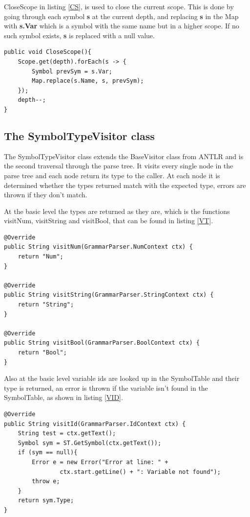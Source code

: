 CloseScope in listing \ref{CS}, is used to close the current scope. This is done by going through each symbol \textbf{s} at the current depth, and replacing \textbf{s} in the Map with \textbf{s.Var} which is a symbol with the same name but in a higher scope. If no such symbol exists, \textbf{s} is replaced with a null value. 

\begin{lstlisting}[caption={CloseScope function}, label={CS}]
public void CloseScope(){
    Scope.get(depth).forEach(s -> {
        Symbol prevSym = s.Var;
        Map.replace(s.Name, s, prevSym);
    });
    depth--;
}
\end{lstlisting}



\subsection{The SymbolTypeVisitor class}
The SymbolTypeVisitor class extends the BaseVisitor class from ANTLR and is the second traversal through the parse tree. It visits every single node in  the parse tree and each node return its type to the caller. At each node it is determined whether the types returned match with the expected type, errors are thrown if they don't match.

At the basic level the types are returned as they are, which is the functions visitNum, visitString and visitBool, that can be found in listing \ref{VT}.

\begin{lstlisting}[caption={SymbolTypeVisitor - visitNum, visitString and visitBool functions}, label={VT}]
@Override
public String visitNum(GrammarParser.NumContext ctx) {
    return "Num";
}

@Override
public String visitString(GrammarParser.StringContext ctx) {
    return "String";
}

@Override
public String visitBool(GrammarParser.BoolContext ctx) {
    return "Bool";
}
\end{lstlisting}

Also at the basic level variable ids are looked up in the SymbolTable and their type is returned, an error is thrown if the variable isn't found in the SymbolTable, as shown in listing \ref{VID}.

\begin{lstlisting}[caption={SymbolTypeVisitor - visitId function}, label={VID}]
@Override
public String visitId(GrammarParser.IdContext ctx) {
    String test = ctx.getText();
    Symbol sym = ST.GetSymbol(ctx.getText());
    if (sym == null){
        Error e = new Error("Error at line: " +
                ctx.start.getLine() + ": Variable not found");
        throw e;
    }
    return sym.Type;
}
\end{lstlisting}

